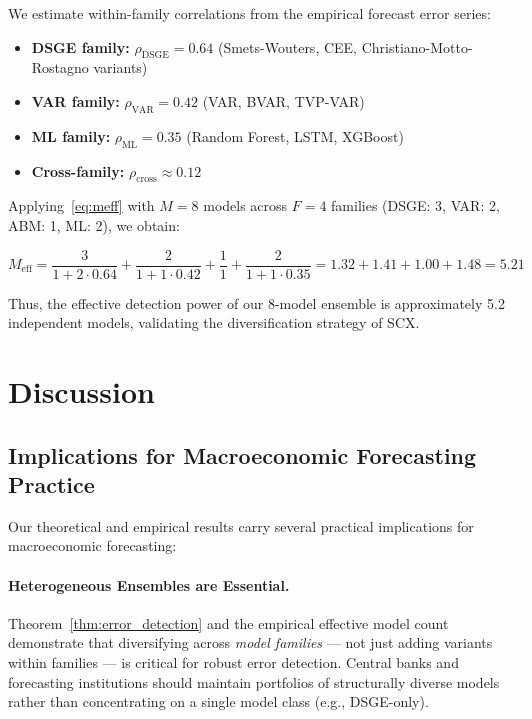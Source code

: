 \documentclass[12pt,a4paper]{article}
\begin{document}
We estimate within-family correlations from the empirical forecast
error series:

\begin{itemize}[leftmargin=*]
    \item \textbf{DSGE family:} $\rho_{\text{DSGE}} = 0.64$
    (Smets-Wouters, CEE, Christiano-Motto-Rostagno variants)
    \item \textbf{VAR family:} $\rho_{\text{VAR}} = 0.42$
    (VAR, BVAR, TVP-VAR)
    \item \textbf{ML family:} $\rho_{\text{ML}} = 0.35$
    (Random Forest, LSTM, XGBoost)
    \item \textbf{Cross-family:} $\rho_{\text{cross}} \approx 0.12$
\end{itemize}

Applying~\eqref{eq:meff} with $M = 8$ models across $F = 4$ families
(DSGE: 3, VAR: 2, ABM: 1, ML: 2), we obtain:

\begin{equation}
    M_{\text{eff}} = \frac{3}{1 + 2 \cdot 0.64} +
    \frac{2}{1 + 1 \cdot 0.42} + \frac{1}{1} +
    \frac{2}{1 + 1 \cdot 0.35}
    = 1.32 + 1.41 + 1.00 + 1.48 = 5.21 \label{eq:meff_empirical}
\end{equation}

Thus, the effective detection power of our 8-model ensemble is
approximately 5.2 independent models, validating the diversification
strategy of SCX.

\section{Discussion}
\label{sec:discussion}

\subsection{Implications for Macroeconomic Forecasting Practice}

Our theoretical and empirical results carry several practical
implications for macroeconomic forecasting:

\paragraph{Heterogeneous Ensembles are Essential.}
Theorem~\ref{thm:error_detection} and the empirical effective model
count demonstrate that diversifying across \emph{model families} ---
not just adding variants within families --- is critical for robust
error detection.  Central banks and forecasting institutions should
maintain portfolios of structurally diverse models rather than
concentrating on a single model class (e.g., DSGE-only).
\end{document}
